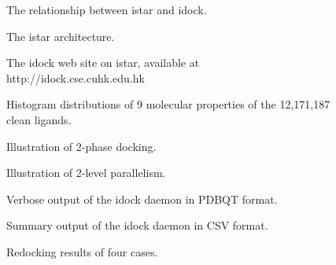 \documentclass[12pt]{article}
\begin{document}

\clearpage



\iffalse

\clearpage

\begin{figure}
\caption{\label{relationship} The relationship between istar and idock.}
\end{figure}

\begin{figure}
\caption{\label{architecture} The istar architecture.}
\end{figure}

\begin{figure}
\caption{\label{idock} The idock web site on istar, available at http://idock.cse.cuhk.edu.hk}
\end{figure}

\begin{figure}
\caption{\label{LigandProperties} Histogram distributions of 9 molecular properties of the 12,171,187 clean ligands.}
\end{figure}

\begin{figure}
\caption{\label{2PhaseDocking} Illustration of 2-phase docking.}
\end{figure}

\begin{figure}
\caption{\label{2LevelParallelism} Illustration of 2-level parallelism.}
\end{figure}

\begin{figure}
\caption{\label{OutputPDBQT} Verbose output of the idock daemon in PDBQT format.}
\end{figure}

\begin{figure}
\caption{\label{OutputCSV} Summary output of the idock daemon in CSV format.}
\end{figure}

\begin{figure}
\caption{\label{Redocking} Redocking results of four cases.}
\end{figure}
\end{document}
